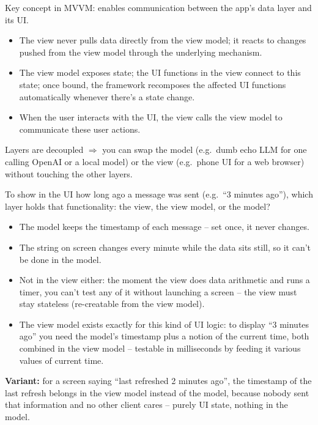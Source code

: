 \begin{defnbox}[title=Observability]
Key concept in MVVM: enables communication between the app's data layer and its UI.
\begin{itemize}
  \item The view never pulls data directly from the view model; it reacts to changes pushed from the view model through the underlying mechanism.
  \item The view model exposes state; the UI functions in the view connect to this state; once bound, the framework recomposes the affected UI functions automatically whenever there's a state change.
  \item When the user interacts with the UI, the view calls the view model to communicate these user actions.
\end{itemize}
\end{defnbox}

\begin{rembox}
Layers are decoupled $\Rightarrow$ you can swap the model (e.g.\ dumb echo LLM for one calling OpenAI or a local model) or the view (e.g.\ phone UI for a web browser) without touching the other layers.
\end{rembox}

\begin{exbox}[title=Where does ``3 minutes ago'' belong?]
To show in the UI how long ago a message was sent (e.g.\ ``3 minutes ago''), which layer holds that functionality: the view, the view model, or the model?
\end{exbox}

\begin{keybox}[title=Answer: the view model]
\begin{itemize}
  \item The model keeps the timestamp of each message -- set once, it never changes.
  \item The string on screen changes every minute while the data sits still, so it can't be done in the model.
  \item Not in the view either: the moment the view does data arithmetic and runs a timer, you can't test any of it without launching a screen -- the view must stay stateless (re-creatable from the view model).
  \item The view model exists exactly for this kind of UI logic: to display ``3 minutes ago'' you need the model's timestamp plus a notion of the current time, both combined in the view model -- testable in milliseconds by feeding it various values of current time.
\end{itemize}
\textbf{Variant:} for a screen saying ``last refreshed 2 minutes ago'', the timestamp of the last refresh belongs in the view model instead of the model, because nobody sent that information and no other client cares -- purely UI state, nothing in the model.
\end{keybox}

